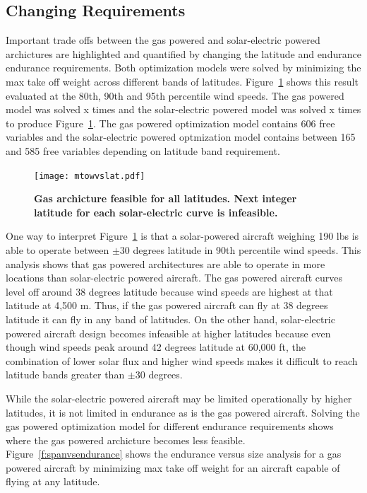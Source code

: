 \subsection{Changing Requirements}

Important trade offs between the gas powered and solar-electric powered archictures are highlighted and quantified by changing the latitude and endurance endurance requirements.   
Both optimization models were solved by minimizing the max take off weight across different bands of latitudes. 
Figure~\ref{f:latvsmtowtrade} shows this result evaluated at the 80th, 90th and 95th percentile wind speeds.  
The gas powered model was solved x times and the solar-electric powered model was solved x times to produce Figure~\ref{f:latvsmtowtrade}.
The gas powered optimization model contains 606 free variables and the solar-electric powered optmization model contains between 165 and 585 free variables depending on latitude band requirement. 

\begin{figure}[H]
	\begin{center}
	\texttt{[image: mtowvslat.pdf]}
    \caption{\textbf{Gas archicture feasible for all latitudes. Next integer latitude for each solar-electric curve is infeasible.}}
    \label{f:latvsmtowtrade}
	\end{center}
\end{figure}

One way to interpret Figure~\ref{f:latvsmtowtrade} is that a solar-powered aircraft weighing 190 lbs is able to operate between $\pm$30 degrees latitude in 90th percentile wind speeds.  
This analysis shows that gas powered architectures are able to operate in more locations than solar-electric powered aircraft.  
The gas powered aircraft curves level off around 38 degrees latitude because wind speeds are highest at that latitude at 4,500 m. 
Thus, if the gas powered aircraft can fly at 38 degrees latitude it can fly in any band of latitudes.  
On the other hand, solar-electric powered aircraft design becomes infeasible at higher latitudes because even though wind speeds peak around 42 degrees latitude at 60,000 ft, the combination of lower solar flux and higher wind speeds makes it difficult to reach latitude bands greater than $\pm$30 degrees. 

While the solar-electric powered aircraft may be limited operationally by higher latitudes, it is not limited in endurance as is the gas powered aircraft.
Solving the gas powered optimization model for different endurance requirements shows where the gas powered archicture becomes less feasible. 
Figure~\ref{f:spanvsendurance} shows the endurance versus size analysis for a gas powered aircraft by minimizing max take off weight for an aircraft capable of flying at any latitude. 


